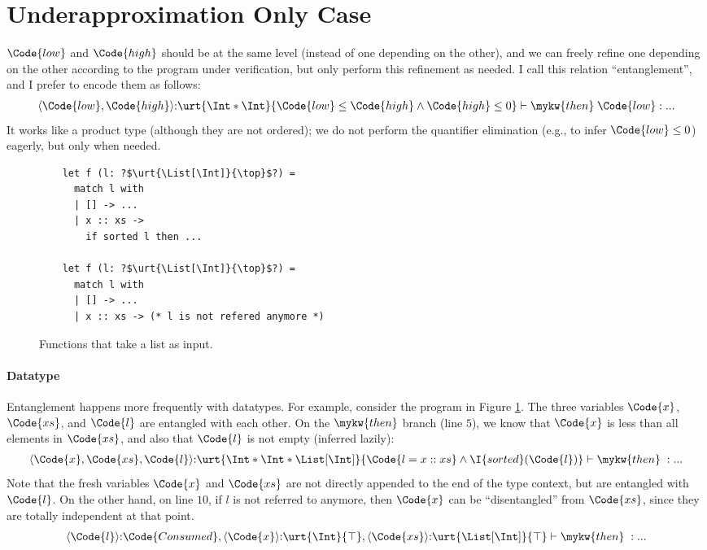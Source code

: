 \section{Underapproximation Only Case}

$\Code{low}$ and $\Code{high}$ should be at the same level (instead of one depending on the other), and we can freely refine one depending on the other according to the program under verification, but only perform this refinement as needed. I call this relation ``entanglement'', and I prefer to encode them as follows:
\begin{align*}
    \langle\Code{low}, \Code{high} \rangle {:} \urt{\Int*\Int}{\Code{low} \leq \Code{high} \land \Code{high} \leq 0} \vdash \mykw{then}\; \Code{low} : ...
\end{align*}\noindent
It works like a product type (although they are not ordered); we do not perform the quantifier elimination (e.g., to infer $\Code{low} \leq 0$) eagerly, but only when needed.

\begin{figure}[h]
    \centering
    \begin{verbatim}
    let f (l: ?$\urt{\List[\Int]}{\top}$?) =
      match l with
      | [] -> ... 
      | x :: xs ->
        if sorted l then ...

    let f (l: ?$\urt{\List[\Int]}{\top}$?) =
      match l with
      | [] -> ... 
      | x :: xs -> (* l is not refered anymore *)
    \end{verbatim}
    \caption{Functions that take a list as input.}
    \label{fig:list-sort}
\end{figure}

\paragraph{Datatype} Entanglement happens more frequently with datatypes. For example, consider the program in Figure \ref{fig:list-sort}. The three variables $\Code{x}$, $\Code{xs}$, and $\Code{l}$ are entangled with each other. On the $\mykw{then}$ branch (line $5$), we know that $\Code{x}$ is less than all elements in $\Code{xs}$, and also that $\Code{l}$ is not empty (inferred lazily):
\begin{align*}
    \langle\Code{x}, \Code{xs}, \Code{l} \rangle {:} \urt{\Int*\Int*\List[\Int]}{\Code{l = x::xs} \land \I{sorted}(\Code{l})} \vdash \mykw{then}\;  : ...
\end{align*}\noindent
Note that the fresh variables $\Code{x}$ and $\Code{xs}$ are not directly appended to the end of the type context, but are entangled with $\Code{l}$.
On the other hand, on line $10$, if $l$ is not referred to anymore, then $\Code{x}$ can be ``disentangled'' from $\Code{xs}$, since they are totally independent at that point.
\begin{align*}
    \langle\Code{l}\rangle{:}\Code{Consumed}, \langle\Code{x}\rangle{:}\urt{\Int}{\top}, \langle\Code{xs}\rangle{:}\urt{\List[\Int]}{\top} \vdash \mykw{then}\;  : ...
\end{align*}\noindent

